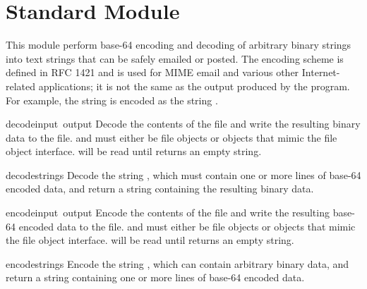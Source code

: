 \section{Standard Module }
\label{module-base64}

This module perform base-64 encoding and decoding of arbitrary binary
strings into text strings that can be safely emailed or posted.  The
encoding scheme is defined in RFC 1421 and is used for MIME email and
various other Internet-related applications; it is not the same as the
output produced by the  program.  For example, the
string  is encoded as the string
.  

\begin{funcdesc}{decode}{input\, output}
Decode the contents of the  file and write the resulting
binary data to the  file.
 and  must either be file objects or objects that
mimic the file object interface.  will be read until
 returns an empty string.
\end{funcdesc}

\begin{funcdesc}{decodestring}{s}
Decode the string , which must contain one or more lines of
base-64 encoded data, and return a string containing the resulting
binary data.
\end{funcdesc}

\begin{funcdesc}{encode}{input\, output}
Encode the contents of the  file and write the resulting
base-64 encoded data to the  file.
 and  must either be file objects or objects that
mimic the file object interface.  will be read until
 returns an empty string.
\end{funcdesc}

\begin{funcdesc}{encodestring}{s}
Encode the string , which can contain arbitrary binary data,
and return a string containing one or more lines of
base-64 encoded data.
\end{funcdesc}


